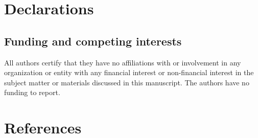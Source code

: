 \documentclass[
  11pt,
  letterpaper,
]{article}
\begin{document}
\section*{Declarations}\label{declarations}

\subsection*{Funding and competing
interests}\label{funding-and-competing-interests}

All authors certify that they have no affiliations with or involvement
in any organization or entity with any financial interest or
non-financial interest in the subject matter or materials discussed in
this manuscript. The authors have no funding to report.

\section*{References}\label{references}
\end{document}
